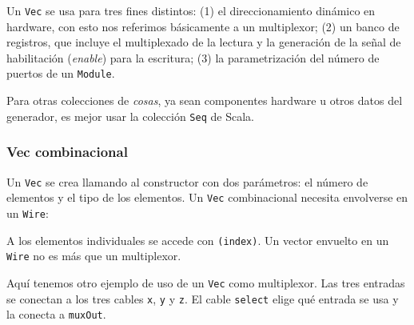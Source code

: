 \documentclass[%
    10pt,
    headinclude, footinclude=false,
    openright, %
    notitlepage,
    cleardoublepage=empty,
    headsepline,
    numbers=noenddot,
    bibliography=totoc, index=totoc,
    ]{scrbook}
\newcommand{\code}[1]{{\lstinline[basicstyle=\small\ttfamily]{#1}}}
\begin{document}

Un \code{Vec} se usa para tres fines distintos: (1) el direccionamiento dinámico en hardware,
con esto nos referimos básicamente a un multiplexor; (2) un banco de registros, que incluye el multiplexado 
de la lectura y la generación de la señal de habilitación (\emph{enable}) para la escritura; (3) la 
parametrización del número de puertos de un \code{Module}. 

Para otras colecciones de \emph{cosas}, ya sean 
componentes hardware u otros datos del generador, es mejor usar la colección \code{Seq} de Scala.

\subsubsection{Vec combinacional}


Un \code{Vec} se crea llamando al constructor con dos parámetros: el
número de elementos y el tipo de los elementos. Un \code{Vec} combinacional
necesita envolverse en un \code{Wire}:



\noindent A los elementos individuales se accede con \code{(index)}.
Un vector envuelto en un \code{Wire} no es más que un multiplexor.



Aquí tenemos otro ejemplo de uso de un \code{Vec} como multiplexor.
Las tres entradas se conectan a los tres cables \code{x}, \code{y}
y \code{z}. El cable \code{select} elige qué entrada se usa y
la conecta a \code{muxOut}.
\end{document}
